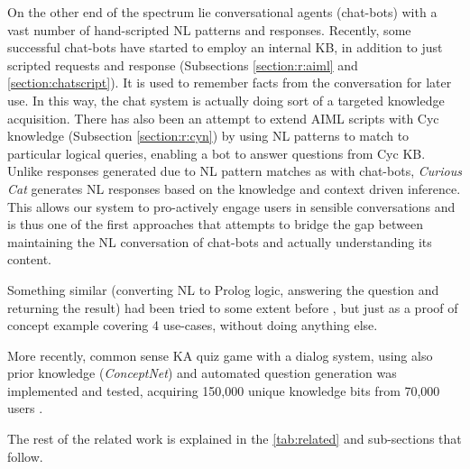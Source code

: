 On the other end of the spectrum lie conversational agents (chat-bots) with a 
vast number of hand-scripted NL patterns and responses.
Recently, some successful chat-bots have started to employ an internal KB, in
addition to just scripted requests and response (Subsections 
\ref{section:r:aiml} and \ref{section:chatscript}). It is used to remember facts 
from the conversation for later use. In this way, the chat system is actually 
doing sort of a targeted knowledge acquisition. There has also been an attempt to 
extend AIML scripts with Cyc knowledge (Subsection \ref{section:r:cyn}) by 
using NL patterns to match to particular logical queries, enabling a bot to 
answer questions from Cyc KB. Unlike responses generated due to NL pattern 
matches as with chat-bots, \emph{Curious Cat} generates NL responses based on 
the knowledge and context driven inference. This allows our system to 
pro-actively engage users in sensible conversations and is thus one of the first 
approaches that attempts to bridge the gap between maintaining the NL 
conversation of chat-bots and actually understanding its content.

Something similar (converting NL to Prolog logic, answering the question and
returning the result) had been tried to some extent before \parencite{Baral2007},
but just as a proof of concept example covering 4 use-cases, without doing 
anything else.

More recently, common sense KA quiz game with a dialog system, using also prior
knowledge (\emph{ConceptNet}) and automated question generation was implemented 
and tested, acquiring 150,000 unique knowledge bits from 70,000 users
\parencite{Otani2016}. 

The rest of the related work is explained in the \autoref{tab:related} and 
sub-sections that follow.

